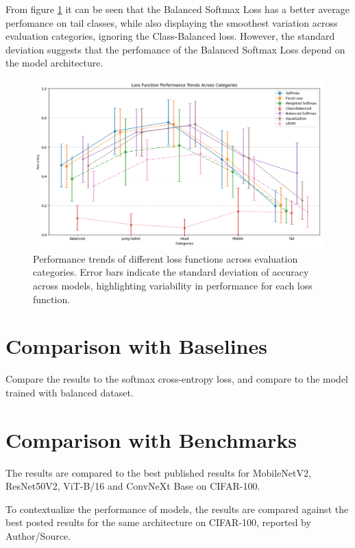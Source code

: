 From figure \ref{fig:loss_comparison} it can be seen that the Balanced Softmax Loss has a better average perfomance on tail classes, while also displaying the smoothest variation across evaluation categories, ignoring the Class-Balanced loss. However, the standard deviation suggests that the perfomance of the Balanced Softmax Loss depend on the model architecture.

\begin{figure}[h!]
    \centering
    \includegraphics[width=\textwidth]{Images/Plots/loss_comparison.png}
    \caption{Performance trends of different loss functions across evaluation categories. Error bars indicate the standard deviation of accuracy across models, highlighting variability in performance for each loss function.}
    \label{fig:loss_comparison}
\end{figure}



\section{Comparison with Baselines}
Compare the results to the softmax cross-entropy loss, and compare to the model trained with balanced dataset.

\section{Comparison with Benchmarks}
The results are compared to the best published results for MobileNetV2, ResNet50V2, ViT-B/16 and ConvNeXt Base on CIFAR-100.

To contextualize the performance of models, the results are compared against the best posted results for the same architecture on CIFAR-100, reported by Author/Source.

